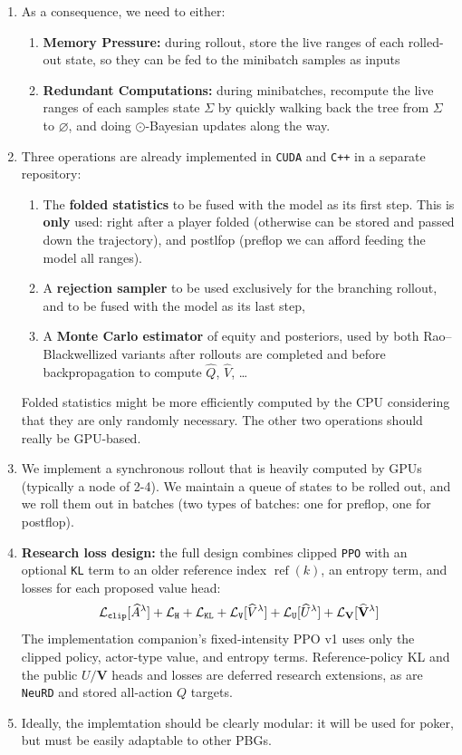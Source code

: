 \documentclass[12pt, a4paper]{article}
\begin{document}
\begin{enumerate}
  \item As a consequence, we need to either:
  \begin{enumerate}
    \item \textbf{Memory Pressure:} during rollout, store the live ranges of each rolled-out state, so they can be fed to the minibatch samples as inputs
    \item \textbf{Redundant Computations:} during minibatches, recompute the live ranges of each samples state $\Sigma$ by quickly walking back the tree from $\Sigma$ to $\varnothing$, and doing $\odot$-Bayesian updates along the way.
  \end{enumerate}

  \item Three operations are already implemented in \texttt{CUDA} and \texttt{C++} in a separate repository:
  \begin{enumerate}
    \item The \textbf{folded statistics} to be fused with the model as its first step.
    This is \textbf{only} used: right after a player folded (otherwise can be stored and passed down the trajectory), and postlfop (preflop we can afford feeding the model all ranges). 
    \item A \textbf{rejection sampler} to be used exclusively for the branching rollout, and to be fused with the model as its last step,
    \item A \textbf{Monte Carlo estimator} of equity and posteriors, used by both Rao--Blackwellized variants after rollouts are completed and before backpropagation to compute $\widehat{Q}$, $\widehat{V}$, \ldots
  \end{enumerate} 
  Folded statistics might be more efficiently computed by the CPU considering that they are only randomly necessary.
  The other two operations should really be GPU-based.

  \item We implement a synchronous rollout that is heavily computed by GPUs (typically a node of 2-4).
  We maintain a queue of states to be rolled out, and we roll them out in batches (two types of batches: one for preflop, one for postflop).

  \item \textbf{Research loss design:} the full design combines clipped \texttt{PPO} with an optional \texttt{KL} term to an older reference index $\operatorname{ref}(k)$, an entropy term, and losses for each proposed value head:
  \[
    \mathcal L_{\tt clip}[\widehat A^\lambda]+\mathcal L_{\tt H} + \mathcal L_{\tt KL} + \mathcal L_{\tt V}[\widehat V^\lambda] + \mathcal L_{\tt U}[\widehat U^\lambda]+\mathcal L_{\mathbf V}[\widehat{\mathbf V}^\lambda]
  \]
  The implementation companion's fixed-intensity PPO v1 uses only the clipped policy, actor-type value, and entropy terms. Reference-policy KL and the public $U/\mathbf V$ heads and losses are deferred research extensions, as are \texttt{NeuRD} and stored all-action $Q$ targets.

  \item Ideally, the implemtation should be clearly modular: it will be used for poker, but must be easily adaptable to other PBGs.
\end{enumerate}
\end{document}
